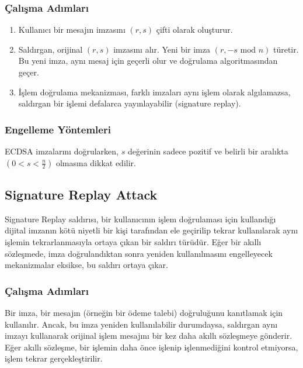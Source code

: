 \subsubsection{Çalışma Adımları}

\begin{enumerate}
    \item Kullanıcı bir mesajın imzasını $(r, s)$ çifti olarak oluşturur.
    \item Saldırgan, orijinal $(r, s)$ imzasını alır. Yeni bir imza $(r, -s \text{ mod } n)$ türetir. Bu yeni imza, aynı mesaj için geçerli olur ve doğrulama algoritmasından geçer.
    \item İşlem doğrulama mekanizması, farklı imzaları aynı işlem olarak algılamazsa, saldırgan bir işlemi defalarca yayınlayabilir (signature replay).
\end{enumerate}

\subsubsection{Engelleme Yöntemleri}

ECDSA imzalarını doğrularken, $s$ değerinin sadece pozitif ve belirli bir aralıkta $(0 < s < \frac{n}{2})$ olmasına dikkat edilir.

\newpage

\subsection{Signature Replay Attack}

Signature Replay saldırısı, bir kullanıcının işlem doğrulaması için kullandığı dijital imzanın kötü niyetli bir kişi tarafından ele geçirilip tekrar kullanılarak aynı işlemin tekrarlanmasıyla ortaya çıkan bir saldırı türüdür. Eğer bir akıllı sözleşmede, imza doğrulandıktan sonra yeniden kullanılmasını engelleyecek mekanizmalar eksikse, bu saldırı ortaya çıkar. 

\subsubsection{Çalışma Adımları}

Bir imza, bir mesajın (örneğin bir ödeme talebi) doğruluğunu kanıtlamak için kullanılır. Ancak, bu imza yeniden kullanılabilir durumdaysa, saldırgan aynı imzayı kullanarak orijinal işlem mesajını bir kez daha akıllı sözleşmeye gönderir. Eğer akıllı sözleşme, bir işlemin daha önce işlenip işlenmediğini kontrol etmiyorsa, işlem tekrar gerçekleştirilir.

